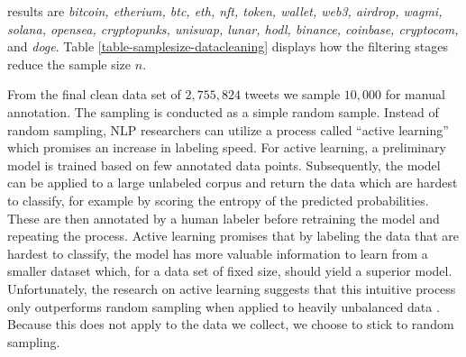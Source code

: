results are \emph{bitcoin, etherium, btc, eth, nft, token, wallet, web3, airdrop, wagmi, solana, opensea, cryptopunks, uniswap, lunar, hodl, binance, coinbase, cryptocom,} and \emph{doge}. Table \ref{table-samplesize-datacleaning} displays how the filtering stages reduce the sample size $n$.



From the final clean data set of $2,755,824$ tweets we sample $10,000$ for manual annotation. The sampling is conducted as a simple random sample. Instead of random sampling, NLP researchers can utilize a process called ``active learning'' which promises an increase in labeling speed. For active learning, a preliminary model is trained based on few annotated data points. Subsequently, the model can be applied to a large unlabeled corpus and return the data which are hardest to classify, for example by scoring the entropy of the predicted probabilities. These are then annotated by a human labeler before retraining the model and repeating the process. Active learning promises that by labeling the data that are hardest to classify, the model has more valuable information to learn from a smaller dataset which, for a data set of fixed size, should yield a superior model. Unfortunately, the research on active learning suggests that this intuitive process only outperforms random sampling when applied to heavily unbalanced data . Because this does not apply to the data we collect, we choose to stick to random sampling.


